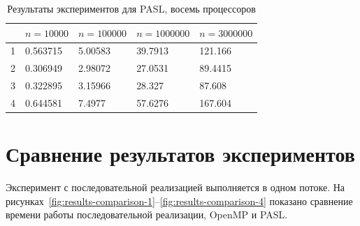 \documentclass[specification,annotation]{itmo-student-thesis}
\begin{document}
\begin{table}[!ht]
\centering
\begin{tabular}{|l|l|l|l|l|}\hline
 & $n=10000$ & $n=100000$ & $n=1000000$ & $n=3000000$ \\\hline
1 & 0.563715 & 5.00583 & 39.7913 & 121.166 \\\hline
2 & 0.306949 & 2.98072 & 27.0531 & 89.4415 \\\hline
3 & 0.322895 & 3.15966 & 28.327 & 87.608 \\\hline
4 & 0.644581 & 7.4977 & 57.6276 & 167.604 \\\hline
\end{tabular}
\caption{Результаты экспериментов для PASL, восемь процессоров}\label{tbl:results-pasl-8}
\end{table}



\section{Сравнение результатов экспериментов}

Эксперимент с последовательной реализацией выполняется в одном потоке. 
На рисунках~\ref{fig:results-comparison-1}--\ref{fig:results-comparison-4} 
показано сравнение времени работы последовательной реализации, OpenMP и PASL. 
\end{document}
